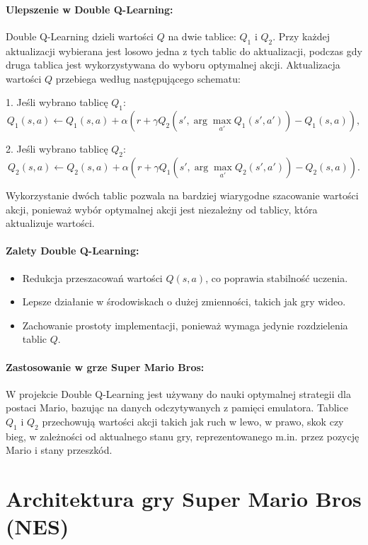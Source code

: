 \paragraph{Ulepszenie w Double Q-Learning:}
Double Q-Learning dzieli wartości \( Q \) na dwie tablice: \( Q_1 \) i \( Q_2 \). Przy każdej aktualizacji wybierana jest losowo jedna z tych tablic do aktualizacji, podczas gdy druga tablica jest wykorzystywana do wyboru optymalnej akcji. Aktualizacja wartości \( Q \) przebiega według następującego schematu:

1. Jeśli wybrano tablicę \( Q_1 \):
\[
Q_1(s, a) \leftarrow Q_1(s, a) + \alpha \left( r + \gamma Q_2(s', \arg\max_{a'} Q_1(s', a')) - Q_1(s, a) \right),
\]

2. Jeśli wybrano tablicę \( Q_2 \):
\[
Q_2(s, a) \leftarrow Q_2(s, a) + \alpha \left( r + \gamma Q_1(s', \arg\max_{a'} Q_2(s', a')) - Q_2(s, a) \right).
\]

Wykorzystanie dwóch tablic pozwala na bardziej wiarygodne szacowanie wartości akcji, ponieważ wybór optymalnej akcji jest niezależny od tablicy, która aktualizuje wartości.

\paragraph{Zalety Double Q-Learning:}
\begin{itemize}
    \item Redukcja przeszacowań wartości \( Q(s, a) \), co poprawia stabilność uczenia.
    \item Lepsze działanie w środowiskach o dużej zmienności, takich jak gry wideo.
    \item Zachowanie prostoty implementacji, ponieważ wymaga jedynie rozdzielenia tablic \( Q \).
\end{itemize}

\paragraph{Zastosowanie w grze Super Mario Bros:}
W projekcie Double Q-Learning jest używany do nauki optymalnej strategii dla postaci Mario, bazując na danych odczytywanych z pamięci emulatora. Tablice \( Q_1 \) i \( Q_2 \) przechowują wartości akcji takich jak ruch w lewo, w prawo, skok czy bieg, w zależności od aktualnego stanu gry, reprezentowanego m.in. przez pozycję Mario i stany przeszkód.

\section{Architektura gry Super Mario Bros (NES)}

